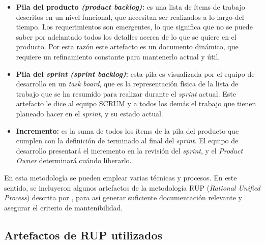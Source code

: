 			\begin{itemize}
				\item \textbf{Pila del producto \textit{(product backlog)}: }
					es una lista de \'{i}tems de trabajo descritos en un nivel funcional, que necesitan ser realizados a lo largo del tiempo. Los requerimientos son emergentes, lo que significa que no se puede saber por adelantado todos los detalles acerca de lo que se quiere en el producto. Por esta raz\'{o}n este artefacto es un documento din\'{a}mico, que requiere un refinamiento constante para mantenerlo actual y \'{u}til.
				
				\item \textbf{Pila del \textit{sprint} \textit{(sprint backlog)}: }
				esta pila es visualizada por el equipo de desarrollo en un \textit{task board}, que es la representaci\'{o}n f\'{i}sica de la lista de trabajo que se ha resumido para realizar durante el \textit{sprint} actual. Este artefacto le dice al equipo SCRUM y a todos los dem\'{a}s el trabajo que tienen planeado hacer en el \textit{sprint}, y su estado actual.
				
				\item \textbf{Incremento: }
				es la suma de todos los \'{i}tems de la pila del producto que cumplen con la definici\'{o}n de terminado al final del \textit{sprint}. El equipo de desarrollo presentar\'{a} el incremento en la revisi\'{o}n del \textit{sprint}, y el \textit{Product Owner} determinar\'{a} cu\'{a}ndo liberarlo.
				
			\end{itemize}
			
En esta metodolog\'{i}a se pueden emplear varias t\'{e}cnicas y procesos. En este sentido, se incluyeron algunos artefactos de la metodolog\'{i}a RUP (\textit{Rational Unified Process}) descrita por , para as\'{i} generar suficiente documentaci\'{o}n relevante y asegurar el criterio de mantenibilidad. 

	\subsection{Artefactos de RUP utilizados}
	

